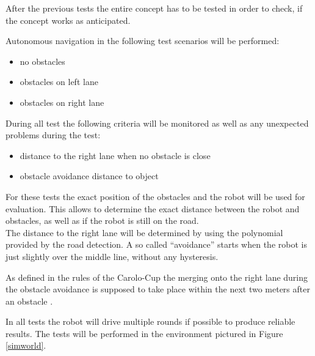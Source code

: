 After the previous tests the entire concept has to be tested in order to check, if the concept works as anticipated.

Autonomous navigation in the following test scenarios will be performed:

\begin{itemize}
	\item no obstacles
	\item obstacles on left lane
	\item obstacles on right lane
\end{itemize}

During all test the following criteria will be monitored as well as any unexpected problems during the test:

\begin{itemize}
	\item distance to the right lane when no obstacle is close
	\item obstacle avoidance distance to object
\end{itemize}

For these tests the exact position of the obstacles and the robot will be used for evaluation. This allows to determine the exact distance between the robot and obstacles, as well as if the robot is still on the road.\\
The distance to the right lane will be determined by using the polynomial provided by the road detection. A so called ``avoidance'' starts when the robot is just slightly over the middle line, without any hysteresis.

As defined in the rules of the Carolo-Cup the merging onto the right lane during the obstacle avoidance is supposed to take place within the next two meters after an obstacle \cite{carolocup}.

In all tests the robot will drive multiple rounds if possible to produce reliable results. The tests will be performed in the environment pictured in Figure \ref{simworld}.\\












